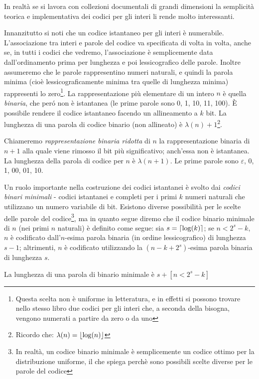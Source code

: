 In realtà se si lavora con collezioni documentali di grandi dimensioni la semplicità teorica e implementativa dei codici per gli interi li rende molto interessanti.

Innanzitutto si noti che un codice istantaneo per gli interi è numerabile. L'associazione tra interi e parole del codice va specificata di volta in volta, anche se, in tutti i codici che vedremo, l'associazione è semplicemente data dall'ordinamento prima per lunghezza e poi lessicografico delle parole. Inoltre assumeremo che le parole rappresentino numeri naturali, e quindi la parola minima (cioè lessicograficamente minima tra quelle di lunghezza minima) rappresenti lo zero\footnote{Questa scelta non è uniforme in letteratura, e in effetti si possono trovare nello stesso libro due codici per gli interi che, a seconda della bisogna, vengono numerati a partire da zero o da uno}.
La rappresentazione più elementare di un intero $n$ è quella \textit{binaria}, che peró non è istantanea (le prime parole sono 0, 1, 10, 11, 100). È possibile rendere il codice istantaneo facendo un allineamento a $k$ bit. La lunghezza di una parola di codice binario (non allineato) è $\lambda(n) + 1$\footnote{Ricordo che: $\lambda(n) = \left\lfloor \log(n) \right\rfloor$}.

Chiameremo \textit{rappresentazione binaria ridotta} di $n$ la rappresentazione binaria di $n + 1$ alla quale viene rimosso il bit più significativo; anch'essa non è istantanea. La lunghezza della parola di codice per $n$ è $\lambda(n + 1)$. Le prime parole sono $\varepsilon$, 0, 1, 00, 01, 10.

Un ruolo importante nella costruzione dei codici istantanei è svolto dai \textit{codici binari minimali} - codici istantanei e completi per i primi $k$ numeri naturali che utilizzano un numero variabile di bit. Esistono diverse possibilità per le scelte delle parole del codice\footnote{In realtà, un codice binario minimale è semplicemente un codice ottimo per la distribuzione uniforme, il che spiega perchè sono possibili scelte diverse per le parole del codice}, ma in quanto segue diremo che il codice binario minimale di $n$ (nei primi $n$ naturali) è definito come segue: sia $s = \left\lceil \log(k) \right\rceil$; se $n < 2^s -k$, $n$ è codificato dall'$n$-esima parola binaria (in ordine lessicografico) di lunghezza $s - 1$; altrimenti, $n$ è codificato utilizzando la $(n - k + 2^s)$-esima parola binaria di lunghezza $s$.

La lunghezza di una parola di binario minimale è $s + [n < 2^s - k]$

